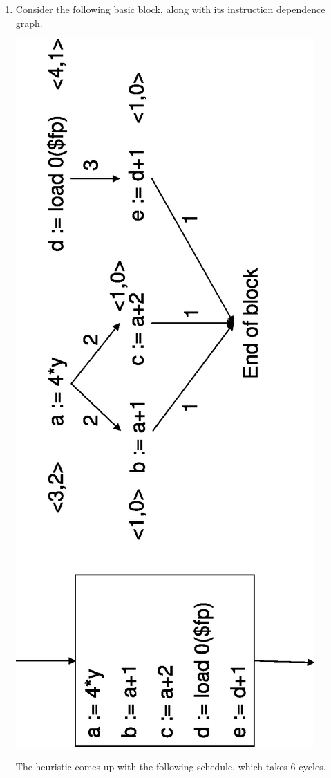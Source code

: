 \documentclass{article}
\begin{document}
\begin{enumerate}
\begin{enumerate}
\item
Consider the following basic block, along with its instruction
dependence graph. 
\begin{center}
\includegraphics[angle=-90,scale=0.5]{wa10-s2b}
\end{center}
The heuristic comes up with the following schedule, which takes $6$
cycles. 


\end{enumerate}
\end{enumerate}
\end{document}

